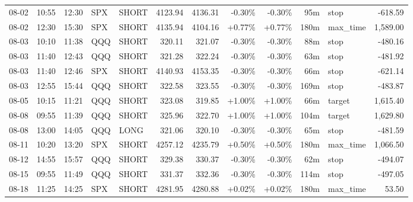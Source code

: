 \documentclass[11pt,a4paper]{article}
\begin{document}
\begin{center}
\begin{longtable}{>{\color{txtmain}}l l l l l r r r r r >{\color{txtmain}}l r}
08-02 & 10:55 & 12:30 & SPX & SHORT & 4123.94 & 4136.31 & \textcolor{lossred}{-0.30\%} & \textcolor{lossred}{-0.30\%} & 95m & stop & \textcolor{lossred}{-618.59} \\
08-02 & 12:30 & 15:30 & SPX & SHORT & 4135.94 & 4104.16 & \textcolor{wingreen}{+0.77\%} & \textcolor{wingreen}{+0.77\%} & 180m & max\_time & \textcolor{wingreen}{1,589.00} \\
08-03 & 10:10 & 11:38 & QQQ & SHORT & 320.11 & 321.07 & \textcolor{lossred}{-0.30\%} & \textcolor{lossred}{-0.30\%} & 88m & stop & \textcolor{lossred}{-480.16} \\
08-03 & 11:40 & 12:43 & QQQ & SHORT & 321.28 & 322.24 & \textcolor{lossred}{-0.30\%} & \textcolor{lossred}{-0.30\%} & 63m & stop & \textcolor{lossred}{-481.92} \\
08-03 & 11:40 & 12:46 & SPX & SHORT & 4140.93 & 4153.35 & \textcolor{lossred}{-0.30\%} & \textcolor{lossred}{-0.30\%} & 66m & stop & \textcolor{lossred}{-621.14} \\
08-03 & 12:55 & 15:44 & QQQ & SHORT & 322.58 & 323.55 & \textcolor{lossred}{-0.30\%} & \textcolor{lossred}{-0.30\%} & 169m & stop & \textcolor{lossred}{-483.87} \\
08-05 & 10:15 & 11:21 & QQQ & SHORT & 323.08 & 319.85 & \textcolor{wingreen}{+1.00\%} & \textcolor{wingreen}{+1.00\%} & 66m & target & \textcolor{wingreen}{1,615.40} \\
08-08 & 09:55 & 11:39 & QQQ & SHORT & 325.96 & 322.70 & \textcolor{wingreen}{+1.00\%} & \textcolor{wingreen}{+1.00\%} & 104m & target & \textcolor{wingreen}{1,629.80} \\
08-08 & 13:00 & 14:05 & QQQ & LONG & 321.06 & 320.10 & \textcolor{lossred}{-0.30\%} & \textcolor{lossred}{-0.30\%} & 65m & stop & \textcolor{lossred}{-481.59} \\
08-11 & 10:20 & 13:20 & SPX & SHORT & 4257.12 & 4235.79 & \textcolor{wingreen}{+0.50\%} & \textcolor{wingreen}{+0.50\%} & 180m & max\_time & \textcolor{wingreen}{1,066.50} \\
08-12 & 14:55 & 15:57 & QQQ & SHORT & 329.38 & 330.37 & \textcolor{lossred}{-0.30\%} & \textcolor{lossred}{-0.30\%} & 62m & stop & \textcolor{lossred}{-494.07} \\
08-15 & 09:55 & 11:49 & QQQ & SHORT & 331.37 & 332.36 & \textcolor{lossred}{-0.30\%} & \textcolor{lossred}{-0.30\%} & 114m & stop & \textcolor{lossred}{-497.05} \\
08-18 & 11:25 & 14:25 & SPX & SHORT & 4281.95 & 4280.88 & \textcolor{wingreen}{+0.02\%} & \textcolor{wingreen}{+0.02\%} & 180m & max\_time & \textcolor{wingreen}{53.50} \\

\end{longtable}
\end{center}
\end{document}

